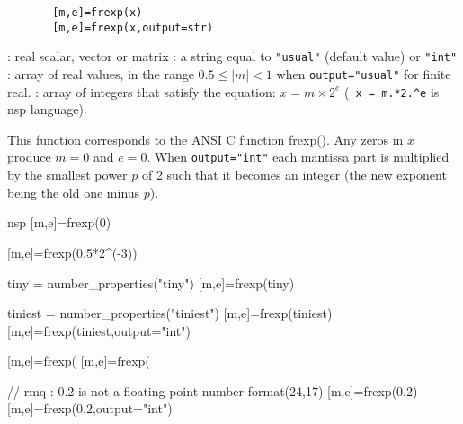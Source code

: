 

\begin{mandesc}
\end{mandesc}


\begin{calling_sequence}
    \begin{verbatim}
       [m,e]=frexp(x)  
       [m,e]=frexp(x,output=str)  
    \end{verbatim}
\end{calling_sequence}


\begin{parameters}
  \begin{varlist}
   : real scalar, vector or matrix
   : a string equal to \verb+"usual"+ (default value) or  \verb+"int"+
   : array of real values, in the range $0.5 \le |m| < 1$ when \verb+output="usual"+
              for finite real. 
   : array of integers that satisfy the equation: $x = m
   \times 2^e$ (\verb+ x = m.*2.^e+ is nsp language).
  \end{varlist}
\end{parameters}

\begin{mandescription}
    This function corresponds to the ANSI C function frexp().
  Any zeros in $x$ produce $m=0$ and $e=0$. When \verb+output="int"+ each
  mantissa part is multiplied by the smallest power $p$ of 2 such that it becomes
  an integer (the new exponent being the old one minus $p$).
\end{mandescription}


\begin{examples}

\begin{mintednsp}{nsp}
[m,e]=frexp(0)

[m,e]=frexp(0.5*2^(-3))

tiny = number_properties("tiny")
[m,e]=frexp(tiny)

tiniest = number_properties("tiniest")
[m,e]=frexp(tiniest)
[m,e]=frexp(tiniest,output="int")

[m,e]=frexp(%
[m,e]=frexp(%

// rmq : 0.2 is not a floating point number
format(24,17)
[m,e]=frexp(0.2)
[m,e]=frexp(0.2,output="int")
\end{mintednsp}

\end{examples}


\begin{manseealso}
\end{manseealso}


